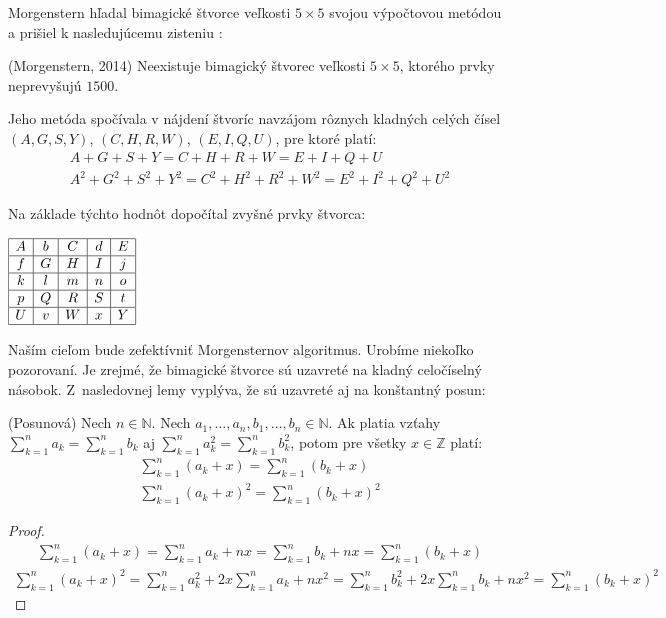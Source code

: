 Morgenstern hľadal bimagické štvorce veľkosti $5 \times 5$ svojou výpočtovou metódou a prišiel k nasledujúcemu zisteniu \cite{multimagie}:

\begin{theorem} (Morgenstern, 2014) Neexistuje bimagický štvorec veľkosti $5 \times 5$, ktorého prvky neprevyšujú $1500$.
\end{theorem}

Jeho metóda spočívala v nájdení štvoríc navzájom rôznych kladných celých čísel $(A,G,S,Y)$, $(C,H,R,W)$, $(E,I,Q,U)$, pre ktoré platí:
\begin{gather*}
A+G+S+Y = C+H+R+W = E+I+Q+U \\
A^2+G^2+S^2+Y^2 = C^2+H^2+R^2+W^2 = E^2+I^2+Q^2+U^2
\end{gather*}

Na základe týchto hodnôt dopočítal zvyšné prvky štvorca:

\begin{center}
$\begin{array}{ |c|c|c|c|c| }
\hline
A & b & C & d & E \\ 
\hline
f & G & H & I & j  \\ 
\hline
k & l & m & n & o \\ 
\hline
p & Q & R & S & t \\ 
\hline
U & v & W & x & Y \\
\hline
\end{array}$
\end{center}

Naším cieľom bude zefektívniť Morgensternov algoritmus. Urobíme niekoľko pozorovaní. Je zrejmé, že bimagické štvorce sú uzavreté na kladný celočíselný násobok. Z~nasledovnej lemy vyplýva, že sú uzavreté aj na konštantný posun:

\begin{lemma}
\label{pos}
(Posunová) Nech $n \in \mathbb{N}$. Nech $a_1, \dots , a_n, b_1, \dots , b_n \in \mathbb{N}$. Ak platia vzťahy $\sum_{k=1}^{n} a_k = \sum_{k=1}^{n} b_k$ aj $\sum_{k=1}^{n} a^2_k = \sum_{k=1}^{n} b^2_k$, potom pre všetky $x \in \mathbb{Z}$ platí:
\begin{gather*}
\sum_{k=1}^{n} (a_k + x) = \sum_{k=1}^{n} (b_k + x) \\
\sum_{k=1}^{n} (a_k + x)^2 = \sum_{k=1}^{n} (b_k + x)^2
\end{gather*}
\end{lemma}
 
\begin{proof}
\begin{gather*}
\sum_{k=1}^{n} (a_k + x) = \sum_{k=1}^{n} a_k + nx = \sum_{k=1}^{n} b_k + nx = \sum_{k=1}^{n} (b_k + x)
\end{gather*}
\begin{gather*}
\sum_{k=1}^{n} (a_k + x)^2 = \sum_{k=1}^{n} a^2_k + 2x \sum_{k=1}^{n} a_k + nx^2 = \sum_{k=1}^{n} b^2_k + 2x \sum_{k=1}^{n} b_k + nx^2 = \sum_{k=1}^{n} (b_k + x)^2
\end{gather*}
\end{proof}

